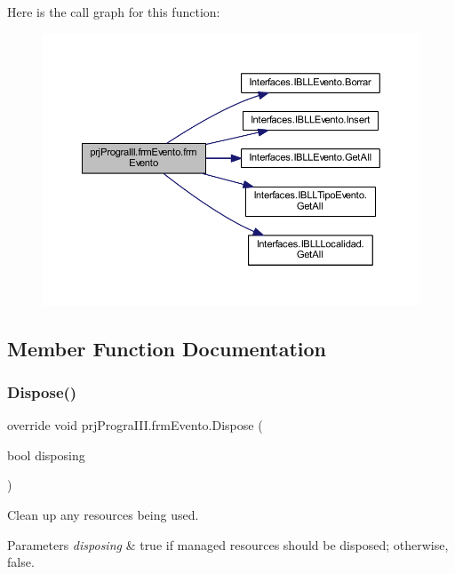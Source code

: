 Here is the call graph for this function\+:
\nopagebreak
\begin{figure}[H]
\begin{center}
\leavevmode
\includegraphics[width=350pt]{classprj_progra_i_i_i_1_1frm_evento_a225e472e6e6ff9d1741b262137bd9c83_cgraph}
\end{center}
\end{figure}


\subsection{Member Function Documentation}
\hypertarget{classprj_progra_i_i_i_1_1frm_evento_a3f617c2ea8998d6fdc25076232c28a36}{}\label{classprj_progra_i_i_i_1_1frm_evento_a3f617c2ea8998d6fdc25076232c28a36} 
\subsubsection{\texorpdfstring{Dispose()}{Dispose()}}
{\footnotesize\ttfamily override void prj\+Progra\+I\+I\+I.\+frm\+Evento.\+Dispose (\begin{DoxyParamCaption}\item[{bool}]{disposing }\end{DoxyParamCaption})\hspace{0.3cm}{\ttfamily [protected]}}



Clean up any resources being used. 


\begin{DoxyParams}{Parameters}
{\em disposing} & true if managed resources should be disposed; otherwise, false.\\
\hline
\end{DoxyParams}


